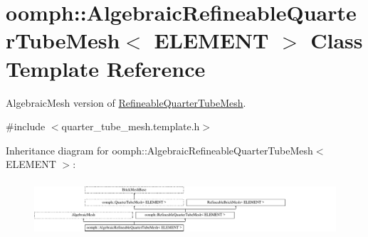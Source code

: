 \hypertarget{classoomph_1_1AlgebraicRefineableQuarterTubeMesh}{}\section{oomph\+:\+:Algebraic\+Refineable\+Quarter\+Tube\+Mesh$<$ E\+L\+E\+M\+E\+NT $>$ Class Template Reference}
\label{classoomph_1_1AlgebraicRefineableQuarterTubeMesh}


Algebraic\+Mesh version of \hyperlink{classoomph_1_1RefineableQuarterTubeMesh}{Refineable\+Quarter\+Tube\+Mesh}.  




{\ttfamily \#include $<$quarter\+\_\+tube\+\_\+mesh.\+template.\+h$>$}

Inheritance diagram for oomph\+:\+:Algebraic\+Refineable\+Quarter\+Tube\+Mesh$<$ E\+L\+E\+M\+E\+NT $>$\+:\begin{figure}[H]
\begin{center}
\leavevmode
\includegraphics[height=2.056933cm]{classoomph_1_1AlgebraicRefineableQuarterTubeMesh}
\end{center}
\end{figure}
